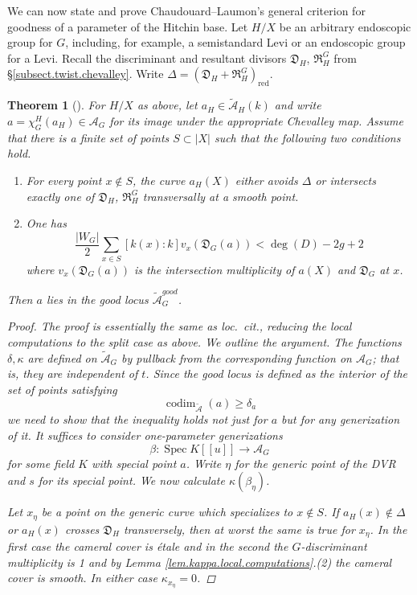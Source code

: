 \documentclass[openany]{amsbook}
\newtheorem{theorem}{Theorem}[chapter]
\theoremstyle{definition}
\theoremstyle{remark}
\numberwithin{equation}{section}
\newcommand{\cA}{\mathcal{A}}
\newcommand{\red}{\mathrm{red}}
\renewcommand{\-}{\operatorname{-}}
\newcommand{\Spec}{\operatorname{Spec}}
\newcommand{\on}[1]{\operatorname{#1}}
\newcommand{\good}{\mathit{good}}
\newcommand{\ctA}{\widetilde{\cA}}
\newcommand{\fD}{\mathfrak{D}}
\newcommand{\fR}{\mathfrak{R}}
\newcommand{\codim}{\on{codim}}
\begin{document}
We can now state and prove Chaudouard--Laumon's general criterion for goodness of a parameter of the Hitchin base. Let $H/X$ be an arbitrary endoscopic group for $G$, including, for example, a semistandard Levi or an endoscopic group for a Levi. Recall the discriminant and resultant divisors $\fD_H$, $\fR_{H}^G$ from \S \ref{subsect.twist.chevalley}. Write $\Delta = (\fD_H + \fR_{H}^G)_{\red}$. 

\begin{theorem}[{\cite[Th\'eor\`eme 9.1.3]{CLII}}]\label{thm.suff.criterion.for.goodness}
    For $H/X$ as above, let $a_H \in \ctA_{H}(k)$ and write $a = \chi^{H}_G(a_H) \in \cA_G$ for its image under the appropriate Chevalley map. Assume that there is a finite set of points $S \subset |X|$ such that the following two conditions hold.
    \begin{enumerate}
        \item For every point $x \not\in S$, the curve $a_H(X)$ either avoids $\Delta$ or intersects exactly one of $\fD_H$, $\fR_{H}^G$ transversally at a smooth point.
        \item One has
        $$
            \frac{|W_G|}{2} \sum_{x \in S} [k(x) : k] v_x(\fD_G(a)) < \deg(D) - 2g + 2
        $$
        where $v_x(\fD_G(a))$ is the intersection multiplicity of $a(X)$ and $\fD_G$ at $x$. 
    \end{enumerate}
    Then $a$ lies in the good locus $\ctA_G^{\good}$. 
    \begin{proof}
        The proof is essentially the same as \textit{loc.\ cit.}, reducing the local computations to the split case as above. We outline the argument. The functions $\delta, \kappa$ are defined on $\ctA_G$ by pullback from the corresponding function on $\cA_G$; that is, they are independent of $t$. Since the good locus is defined as the \emph{interior} of the set of points satisfying 
        $$
            \codim_{\ctA}(a) \ge \delta_a
        $$
        we need to show that the inequality holds not just for $a$ but for any generization of it. It suffices to consider one-parameter generizations
        $$
            \beta : \Spec K[[u]] \to \cA_G
        $$
        for some field $K$ with special point $a$. Write $\eta$ for the generic point of the DVR and $s$ for its special point. We now calculate $\kappa(\beta_\eta)$. 
        
        Let $x_\eta$ be a point on the generic curve which specializes to $x \not\in S$. If $a_{H}(x) \not\in \Delta$ or $a_{H}(x)$ crosses $\fD_{H}$ transversely, then at worst the same is true for $x_\eta$. In the first case the cameral cover is \'etale and in the second the $G$-discriminant multiplicity is 1 and by Lemma \ref{lem.kappa.local.computations}.(2) the cameral cover is smooth. In either case $\kappa_{x_\eta} = 0$. 


\end{proof}
\end{theorem}
\end{document}
